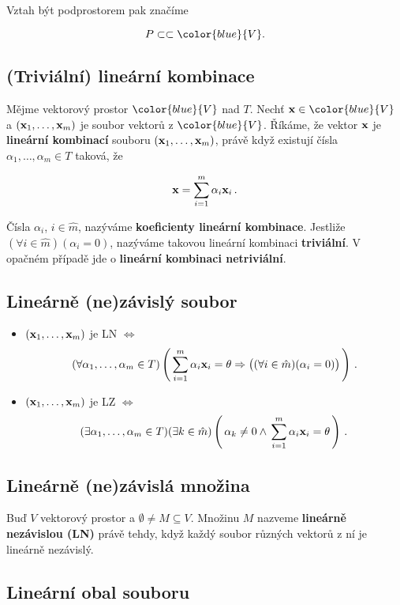 Vztah být podprostorem pak značíme

\[ P\subset \subset \color{blue}{V}. \]

\subsection*{(Triviální) lineární kombinace}

Mějme vektorový prostor $\color{blue}{V}$ nad $T$. Nechť $\vx\in
      \color{blue}{V}$ a $(\mathbf{x}_{1},\dots,\mathbf{x}_{m})$ je soubor vektorů z
$\color{blue}{V}$. Říkáme, že vektor $\mathbf{x}$ je \textbf{lineární kombinací}
souboru $(\mathbf{x}_{1},\dots,\mathbf{x}_{m})$, právě když existují čísla
$\alpha_{1},\dots,\alpha_{m}\in T$ taková, že

\[ \mathbf{x}=\sum_{i=1}^{m}\alpha_{i}\mathbf{x}_{i}\,. \]

Čísla $\alpha_{i}$, $i\in\hat{m}$, nazýváme \textbf{koeficienty lineární kombinace}.
Jestliže $(\forall i\in\hat{m})(\alpha_{i}=0)$, nazýváme takovou lineární kombinaci \textbf{triviální}.
V opačném případě jde o \textbf{lineární kombinaci netriviální}.

\subsection*{Lineárně (ne)závislý soubor}

\begin{itemize}
      \item $(\mathbf{x}_{1},\dots,\mathbf{x}_{m})$ je LN $\Leftrightarrow$
            \[ (\forall \alpha_{1},\dots,\alpha_{m}\in T)\left(\,\sum_{i=1}^{m}\alpha_{i}\mathbf{x}_{i}=\theta \Rightarrow \big((\forall i\in\hat{m})(\alpha_{i}=0)\big)\,\right)\,. \]
      \item $(\mathbf{x}_{1},\dots,\mathbf{x}_{m})$ je LZ $\Leftrightarrow$
            \[ (\exists \alpha_{1},\dots,\alpha_{m}\in T) (\exists k\in\hat{m})
                  \left(\,\alpha_{k}\neq0 \wedge \,\sum_{i=1}^{m}\alpha_{i}\mathbf{x}_{i}=\theta\,\right)\,.
            \]
\end{itemize}

\subsection*{Lineárně (ne)závislá množina}

Buď $V$ vektorový prostor a $\emptyset\neq M\subseteq V$. Množinu $M$ nazveme \textbf{lineárně nezávislou (LN)} právě tehdy, když každý soubor různých vektorů z ní je lineárně nezávislý.

\subsection*{Lineární obal souboru}

